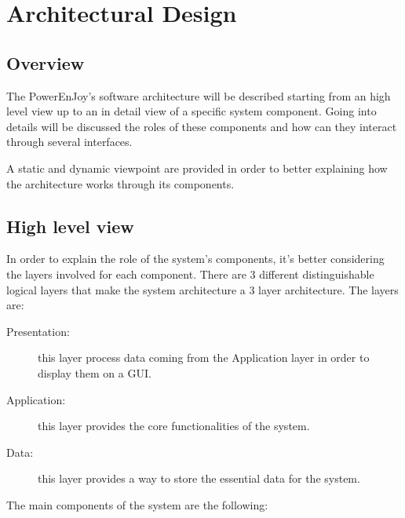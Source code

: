 \section{Architectural Design} \label{sec architectural design}

\subsection{Overview}

The PowerEnJoy's software architecture will be described starting from an high level view up to an in detail view of a specific system component. Going into details will be discussed the roles of these components and how can they interact through several interfaces.

A static and dynamic viewpoint are provided in order to better explaining how the architecture works through its components.

\subsection{High level view}

In order to explain the role of the system's components, it's better considering the layers involved for each component.
There are 3 different distinguishable logical layers that make the system architecture a 3 layer architecture. The layers are:

\begin{description}
	\item[{\color{green} Presentation}:] this layer process data coming from the Application layer in order to display them on a GUI.
	\item[{\color{blue} Application}:] this layer provides the core functionalities of the system.
	\item[{\color{red} Data}:] this layer provides a way to store the essential data for the system.
\end{description}
The main components of the system are the following:


